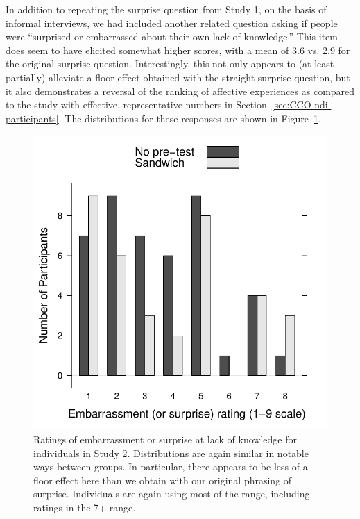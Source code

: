 In addition to repeating the surprise question from Study 1, on the basis of
informal interviews, we had included another related question asking if people
were “surprised or embarrassed about their own lack of knowledge.” This item
does seem to have elicited somewhat higher scores, with a mean of 3.6 vs. 2.9
for the original surprise question. Interestingly, this not only appears to (at
least partially) alleviate a floor effect obtained with the straight surprise
question, but it also demonstrates a reversal of the ranking of affective
experiences as compared to the study with effective, representative numbers in
Section~\ref{sec:CCO-ndi-participants}. The distributions for these responses
are shown in Figure~\ref{fig:rpp-mech-embarrass}.

\begin{figure}
    \centering
    \includegraphics{RPP-mech-embarrass-by-group.pdf}
    \caption{Ratings of embarrassment or surprise at lack of knowledge for
        individuals in Study 2. Distributions are again similar in notable ways
        between groups. In particular, there appears to be less of a floor
        effect here than
        we obtain with our original phrasing of surprise. Individuals are again
    using most of the range, including ratings in the 7+ range.}
    \label{fig:rpp-mech-embarrass}
\end{figure}

